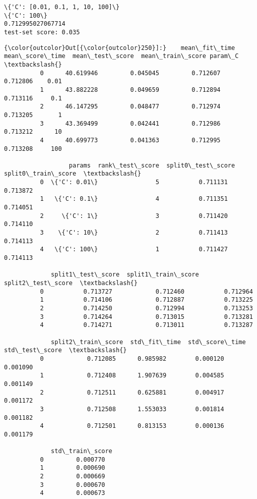 \documentclass[11pt]{article}
\begin{document}
    \begin{Verbatim}[commandchars=\\\{\}]
\{'C': [0.01, 0.1, 1, 10, 100]\}
\{'C': 100\}
0.712995027067714
test-set score: 0.035

    \end{Verbatim}

            \begin{Verbatim}[commandchars=\\\{\}]
{\color{outcolor}Out[{\color{outcolor}250}]:}    mean\_fit\_time  mean\_score\_time  mean\_test\_score  mean\_train\_score param\_C  \textbackslash{}
          0      40.619946         0.045045         0.712607          0.712806    0.01   
          1      43.882228         0.049659         0.712894          0.713116     0.1   
          2      46.147295         0.048477         0.712974          0.713205       1   
          3      43.369499         0.042441         0.712986          0.713212      10   
          4      40.699773         0.041363         0.712995          0.713208     100   
          
                  params  rank\_test\_score  split0\_test\_score  split0\_train\_score  \textbackslash{}
          0  \{'C': 0.01\}                5           0.711131            0.713872   
          1   \{'C': 0.1\}                4           0.711351            0.714051   
          2     \{'C': 1\}                3           0.711420            0.714110   
          3    \{'C': 10\}                2           0.711413            0.714113   
          4   \{'C': 100\}                1           0.711427            0.714113   
          
             split1\_test\_score  split1\_train\_score  split2\_test\_score  \textbackslash{}
          0           0.713727            0.712460           0.712964   
          1           0.714106            0.712887           0.713225   
          2           0.714250            0.712994           0.713253   
          3           0.714264            0.713015           0.713281   
          4           0.714271            0.713011           0.713287   
          
             split2\_train\_score  std\_fit\_time  std\_score\_time  std\_test\_score  \textbackslash{}
          0            0.712085      0.985982        0.000120        0.001090   
          1            0.712408      1.907639        0.004585        0.001149   
          2            0.712511      0.625881        0.004917        0.001172   
          3            0.712508      1.553033        0.001814        0.001182   
          4            0.712501      0.813153        0.000136        0.001179   
          
             std\_train\_score  
          0         0.000770  
          1         0.000690  
          2         0.000669  
          3         0.000670  
          4         0.000673  
\end{Verbatim}
        
\end{document}
